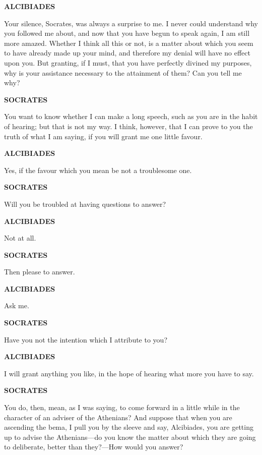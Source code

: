 \documentclass[11pt,letter]{article}
\begin{document}
\par \textbf{ALCIBIADES}
\par   Your silence, Socrates, was always a surprise to me. I never could understand why you followed me about, and now that you have begun to speak again, I am still more amazed. Whether I think all this or not, is a matter about which you seem to have already made up your mind, and therefore my denial will have no effect upon you. But granting, if I must, that you have perfectly divined my purposes, why is your assistance necessary to the attainment of them? Can you tell me why?

\par \textbf{SOCRATES}
\par   You want to know whether I can make a long speech, such as you are in the habit of hearing; but that is not my way. I think, however, that I can prove to you the truth of what I am saying, if you will grant me one little favour.

\par \textbf{ALCIBIADES}
\par   Yes, if the favour which you mean be not a troublesome one.

\par \textbf{SOCRATES}
\par   Will you be troubled at having questions to answer?

\par \textbf{ALCIBIADES}
\par   Not at all.

\par \textbf{SOCRATES}
\par   Then please to answer.

\par \textbf{ALCIBIADES}
\par   Ask me.

\par \textbf{SOCRATES}
\par   Have you not the intention which I attribute to you?

\par \textbf{ALCIBIADES}
\par   I will grant anything you like, in the hope of hearing what more you have to say.

\par \textbf{SOCRATES}
\par   You do, then, mean, as I was saying, to come forward in a little while in the character of an adviser of the Athenians? And suppose that when you are ascending the bema, I pull you by the sleeve and say, Alcibiades, you are getting up to advise the Athenians—do you know the matter about which they are going to deliberate, better than they?—How would you answer?
\end{document}
